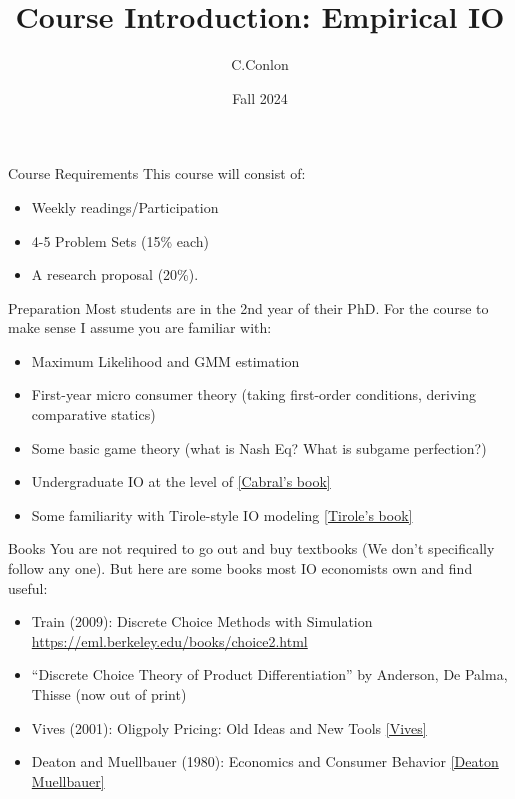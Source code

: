 


\title [Course Intro]{Course Introduction: Empirical IO}
\author{C.Conlon}
\date{Fall 2024}


\begin{frame}
\titlepage
\end{frame}

\begin{frame}{Course Requirements}
This course will consist of:
\begin{itemize}
    \item Weekly readings/Participation
    \item 4-5 Problem Sets (15\% each)
    \item A research proposal (20\%).
\end{itemize}
\end{frame}


\begin{frame}{Preparation}
Most students are in the 2nd year of their PhD. For the course to make sense I assume you are familiar with:
\begin{itemize}
    \item Maximum Likelihood and GMM estimation
    \item First-year micro consumer theory (taking first-order conditions, deriving comparative statics)
    \item Some basic game theory (what is Nash Eq? What is subgame perfection?)
    \item Undergraduate IO at the level of \href{https://www.amazon.com/Introduction-Industrial-Organization-MIT-Press/dp/0262035944}{[Cabral's book]}
    \item Some familiarity with Tirole-style IO modeling \href{https://www.amazon.com/Theory-Industrial-Organization-MIT-Press/dp/0262200716/}{[Tirole's book]}
\end{itemize}
\end{frame}



\begin{frame}{Books}
You are not required to go out and buy textbooks (We don't specifically follow any one). But here are some books most IO economists own and find useful:
\begin{itemize}
    \item Train (2009): Discrete Choice Methods with Simulation \url{https://eml.berkeley.edu/books/choice2.html}
    \item ``Discrete Choice Theory of Product Differentiation'' by Anderson, De Palma, Thisse (now out of print)
    \item Vives (2001): Oligpoly Pricing: Old Ideas and New Tools \href{https://www.amazon.com/Oligopoly-Pricing-Old-Ideas-Tools/dp/026272040X}{[Vives]}
    \item Deaton and Muellbauer (1980): Economics and Consumer Behavior \href{https://www.amazon.com/Economics-Consumer-Behavior-Angus-Deaton/dp/0521296765}{[Deaton Muellbauer]}
\end{itemize}
\end{frame}

